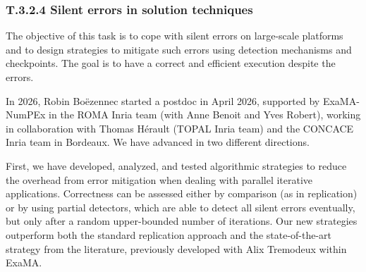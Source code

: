 

\subsubsection{T.3.2.4 Silent errors in solution techniques}

The objective of this task is to cope with silent
errors on large-scale platforms and to design strategies
to mitigate such errors using detection mechanisms and checkpoints. 
The goal is to have a correct and efficient execution despite the errors. 
 
In 2026, Robin Bo\"ezennec started a postdoc  in April 2026, supported by ExaMA-NumPEx
in the ROMA Inria team (with Anne Benoit and Yves Robert), working in 
collaboration with Thomas Hérault (TOPAL Inria team) and the CONCACE Inria team
in Bordeaux. We have advanced in two different directions. 

First, we have developed, analyzed, and
tested algorithmic strategies to reduce the overhead from 
error mitigation when dealing with parallel iterative applications.
Correctness can be assessed either by comparison (as in replication) 
or by using partial detectors, which are able to detect all
silent errors eventually, but only after a random upper-bounded
number of iterations. Our new strategies outperform both the
standard replication approach and the state-of-the-art
strategy from the literature, previously
developed with Alix Tremodeux within ExaMA. 

